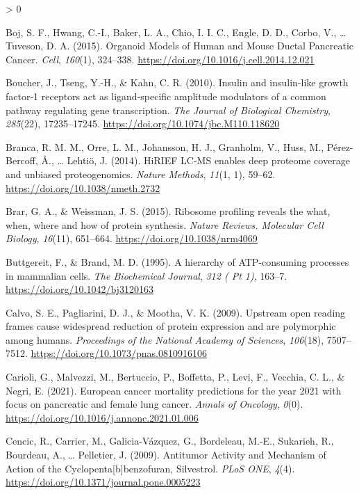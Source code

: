 \documentclass[
  12pt,
  openany]{book}
\newlength{\cslhangindent}
\newenvironment{CSLReferences}[2] %
 {%
  \setlength{\parindent}{0pt}
  \ifodd #1 \everypar{\setlength{\hangindent}{\cslhangindent}}\ignorespaces\fi
  \ifnum #2 > 0
  \setlength{\parskip}{#2\baselineskip}
  \fi
 }%
 {}
\begin{document}
\begin{CSLReferences}{1}{0}
\leavevmode\hypertarget{ref-Boj2015}{}%
Boj, S. F., Hwang, C.-I., Baker, L. A., Chio, I. I. C., Engle, D. D., Corbo, V., \ldots{} Tuveson, D. A. (2015). Organoid {Models} of {Human} and {Mouse Ductal Pancreatic Cancer}. \emph{Cell}, \emph{160}(1), 324--338. \url{https://doi.org/10.1016/j.cell.2014.12.021}

\leavevmode\hypertarget{ref-Boucher2010}{}%
Boucher, J., Tseng, Y.-H., \& Kahn, C. R. (2010). Insulin and insulin-like growth factor-1 receptors act as ligand-specific amplitude modulators of a common pathway regulating gene transcription. \emph{The Journal of Biological Chemistry}, \emph{285}(22), 17235--17245. \url{https://doi.org/10.1074/jbc.M110.118620}

\leavevmode\hypertarget{ref-Branca2014}{}%
Branca, R. M. M., Orre, L. M., Johansson, H. J., Granholm, V., Huss, M., Pérez-Bercoff, Å., \ldots{} Lehtiö, J. (2014). {HiRIEF LC}-{MS} enables deep proteome coverage and unbiased proteogenomics. \emph{Nature Methods}, \emph{11}(1, 1), 59--62. \url{https://doi.org/10.1038/nmeth.2732}

\leavevmode\hypertarget{ref-Brar2015}{}%
Brar, G. A., \& Weissman, J. S. (2015). Ribosome profiling reveals the what, when, where and how of protein synthesis. \emph{Nature Reviews. Molecular Cell Biology}, \emph{16}(11), 651--664. \url{https://doi.org/10.1038/nrm4069}

\leavevmode\hypertarget{ref-Buttgereit1995}{}%
Buttgereit, F., \& Brand, M. D. (1995). A hierarchy of {ATP}-consuming processes in mammalian cells. \emph{The Biochemical Journal}, \emph{312 ( Pt 1)}, 163--7. \url{https://doi.org/10.1042/bj3120163}

\leavevmode\hypertarget{ref-Calvo2009}{}%
Calvo, S. E., Pagliarini, D. J., \& Mootha, V. K. (2009). Upstream open reading frames cause widespread reduction of protein expression and are polymorphic among humans. \emph{Proceedings of the National Academy of Sciences}, \emph{106}(18), 7507--7512. \url{https://doi.org/10.1073/pnas.0810916106}

\leavevmode\hypertarget{ref-Carioli2021}{}%
Carioli, G., Malvezzi, M., Bertuccio, P., Boffetta, P., Levi, F., Vecchia, C. L., \& Negri, E. (2021). European cancer mortality predictions for the year 2021 with focus on pancreatic and female lung cancer. \emph{Annals of Oncology}, \emph{0}(0). \url{https://doi.org/10.1016/j.annonc.2021.01.006}

\leavevmode\hypertarget{ref-Cencic2009}{}%
Cencic, R., Carrier, M., Galicia-Vázquez, G., Bordeleau, M.-E., Sukarieh, R., Bourdeau, A., \ldots{} Pelletier, J. (2009). Antitumor {Activity} and {Mechanism} of {Action} of the {Cyclopenta}{[}b{]}benzofuran, {Silvestrol}. \emph{PLoS ONE}, \emph{4}(4). \url{https://doi.org/10.1371/journal.pone.0005223}


\end{CSLReferences}
\end{document}

